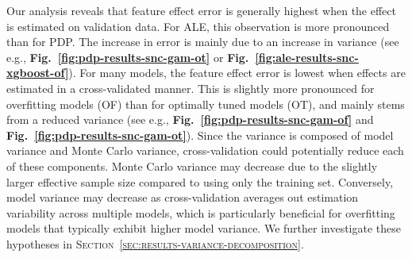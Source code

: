 \documentclass[runningheads]{llncs}
\begin{document}
Our analysis reveals that feature effect error is generally highest when the effect
is estimated on validation data. For ALE, this
observation is more pronounced than for PDP. The increase in error is mainly  %
due to an increase in variance (see e.g.,
\textbf{Fig.\@~\ref{fig:pdp-results-snc-gam-ot}} or
\textbf{Fig.\@~\ref{fig:ale-results-snc-xgboost-of}}). For many models, the
feature effect error is lowest when effects are estimated in a cross-validated manner. This
is slightly more pronounced for overfitting models (OF) than for optimally
tuned models (OT), and mainly stems from a reduced variance (see e.g.,
\textbf{Fig.\@~\ref{fig:pdp-results-snc-gam-of}} and
\textbf{Fig.\@~\ref{fig:pdp-results-snc-gam-ot}}). Since the variance is composed
of model variance and Monte Carlo variance, cross-validation could potentially
reduce each of these components. Monte Carlo variance may decrease due to
the slightly larger effective sample size compared to using only the training set.
Conversely, model variance
may decrease as cross-validation averages out estimation variability across multiple
models, which is particularly beneficial for overfitting models that typically exhibit
higher model variance. We further investigate these hypotheses in
\textsc{Section~\ref{sec:results-variance-decomposition}}.
\end{document}
